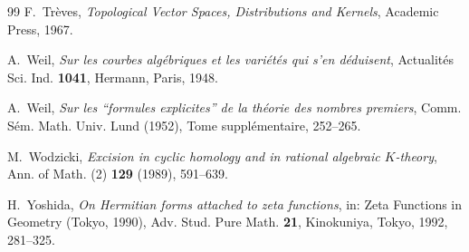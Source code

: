 \documentclass[11pt]{amsart}
\theoremstyle{definition}
\theoremstyle{remark}
\begin{document}
\begin{thebibliography}{99}
F.~Tr\`eves, \emph{Topological Vector Spaces, Distributions and Kernels},
Academic Press, 1967.

A.~Weil, \emph{Sur les courbes alg\'ebriques et les vari\'et\'es qui s'en
d\'eduisent}, Actualit\'es Sci. Ind. \textbf{1041}, Hermann, Paris, 1948.

A.~Weil, \emph{Sur les ``formules explicites'' de la th\'eorie des nombres
premiers}, Comm. S\'em. Math. Univ. Lund (1952), Tome suppl\'ementaire,
252--265.

M.~Wodzicki, \emph{Excision in cyclic homology and in rational algebraic
$K$-theory}, Ann. of Math. (2) \textbf{129} (1989), 591--639.

H.~Yoshida, \emph{On Hermitian forms attached to zeta functions}, in:
Zeta Functions in Geometry (Tokyo, 1990), Adv. Stud. Pure Math. \textbf{21},
Kinokuniya, Tokyo, 1992, 281--325.

\end{thebibliography}
\end{document}
